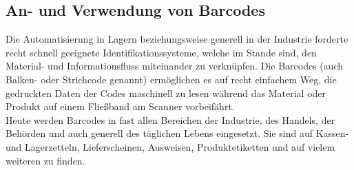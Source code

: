\subsection{An- und Verwendung von Barcodes}
Die Automatisierung in Lagern beziehungsweise generell in der Industrie forderte recht schnell geeignete Identifikationssysteme, welche im Stande sind, den Material- und Informationsfluss miteinander zu verknüpfen. Die Barcodes (auch Balken- oder Strichcode genannt) ermöglichen es auf recht einfachem Weg, die gedruckten Daten der Codes maschinell zu lesen während das Material oder Produkt auf einem Fließband am Scanner vorbeifährt.\\
Heute werden Barcodes in fast allen Bereichen der Industrie, des Handels, der Behörden und auch generell des täglichen Lebens eingesetzt. Sie sind auf Kassen- und Lagerzetteln, Lieferscheinen, Ausweisen, Produktetiketten und auf vielem weiteren zu finden.
\pagebreak
